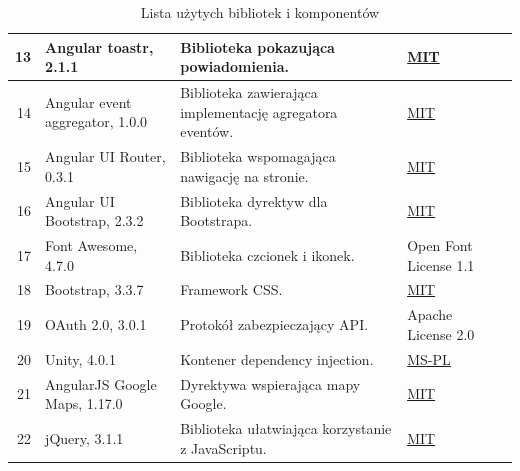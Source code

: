 \documentclass[10pt,a4paper]{article}
\begin{document}
\begin{table}[H]
	\begin{tabularx}{\textwidth}{|r|l|X|l|c|}
		\hline
		13 &
		Angular toastr, 2.1.1 &
		Biblioteka pokazująca powiadomienia. &
		\mbox{\hyperref[abbr:mit]{MIT}} &
		\cite{toastr} \\
		\hline
		14 &
		Angular event aggregator, 1.0.0 &
		Biblioteka zawierająca implementację agregatora eventów. &
		\mbox{\hyperref[abbr:mit]{MIT}} &
		\cite{angularevent} \\
		\hline
		15 &
		Angular UI Router, 0.3.1 &
		Biblioteka wspomagająca nawigację na stronie. &
		\mbox{\hyperref[abbr:mit]{MIT}} &
		\cite{uirouter} \\
		\hline
		16 &
		Angular UI Bootstrap, 2.3.2 &
		Biblioteka dyrektyw dla Bootstrapa. &
		\mbox{\hyperref[abbr:mit]{MIT}} &
		\cite{uibootstrap} \\
		\hline
		17 &
		Font Awesome, 4.7.0 &
		Biblioteka czcionek i ikonek. &
		Open Font License 1.1 &
		\cite{fontawesome} \\
		\hline
		18 &
		Bootstrap, 3.3.7 &
		Framework CSS. &
		\mbox{\hyperref[abbr:mit]{MIT}} &
		\cite{bootstrap} \\
		\hline
		19 &
		OAuth 2.0, 3.0.1 &
		Protokół zabezpieczający API. &
		Apache License 2.0 &
		\cite{oauth} \\
		\hline
		20 &
		Unity, 4.0.1 &
		Kontener dependency injection. &
		\mbox{\hyperref[abbr:mspl]{MS-PL}} &
		\cite{unity} \\
		\hline
		21 &
		AngularJS Google Maps, 1.17.0 &
		Dyrektywa wspierająca mapy Google. &
		\mbox{\hyperref[abbr:mit]{MIT}} &
		\cite{ngmap} \\
		\hline
		22 &
		jQuery, 3.1.1 &
		Biblioteka ułatwiająca korzystanie z JavaScriptu. &
		\mbox{\hyperref[abbr:mit]{MIT}} &
		\cite{jquery} \\
		\hline
	\end{tabularx}
	\caption{Lista użytych bibliotek i komponentów}
\end{table}
\end{document}

